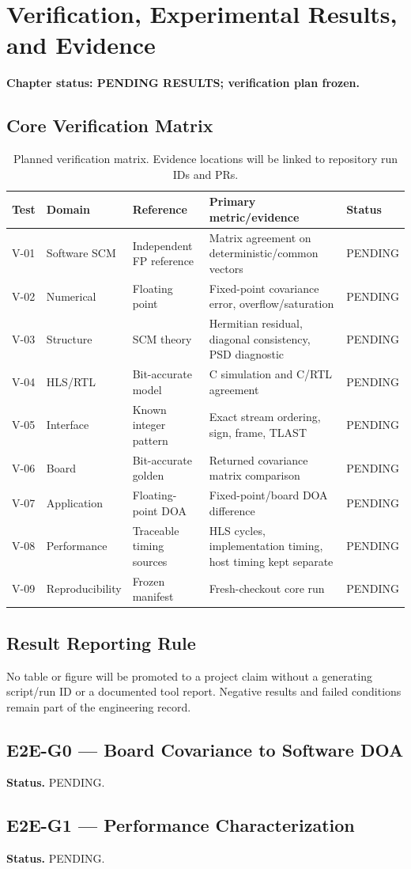 \chapter{Verification, Experimental Results, and Evidence}
\label{ch:verification-results}
\textbf{Chapter status: PENDING RESULTS; verification plan frozen.}

\section{Core Verification Matrix}
\begin{table}[H]
\centering
\caption{Planned verification matrix. Evidence locations will be linked to repository run IDs and PRs.}
\begin{tabularx}{\textwidth}{@{}p{}p{}p{}X p{}@{}}
\toprule
\textbf{Test} & \textbf{Domain} & \textbf{Reference} & \textbf{Primary metric/evidence} & \textbf{Status}\\
\midrule
V-01 & Software SCM & Independent FP reference & Matrix agreement on deterministic/common vectors & PENDING\\
V-02 & Numerical & Floating point & Fixed-point covariance error, overflow/saturation & PENDING\\
V-03 & Structure & SCM theory & Hermitian residual, diagonal consistency, PSD diagnostic & PENDING\\
V-04 & HLS/RTL & Bit-accurate model & C simulation and C/RTL agreement & PENDING\\
V-05 & Interface & Known integer pattern & Exact stream ordering, sign, frame, TLAST & PENDING\\
V-06 & Board & Bit-accurate golden & Returned covariance matrix comparison & PENDING\\
V-07 & Application & Floating-point DOA & Fixed-point/board DOA difference & PENDING\\
V-08 & Performance & Traceable timing sources & HLS cycles, implementation timing, host timing kept separate & PENDING\\
V-09 & Reproducibility & Frozen manifest & Fresh-checkout core run & PENDING\\
\bottomrule
\end{tabularx}
\end{table}

\section{Result Reporting Rule}
No table or figure will be promoted to a project claim without a generating script/run ID or a
documented tool report. Negative results and failed conditions remain part of the engineering
record.

\section{E2E-G0 --- Board Covariance to Software DOA}
\textbf{Status.} PENDING.

\section{E2E-G1 --- Performance Characterization}
\textbf{Status.} PENDING.

